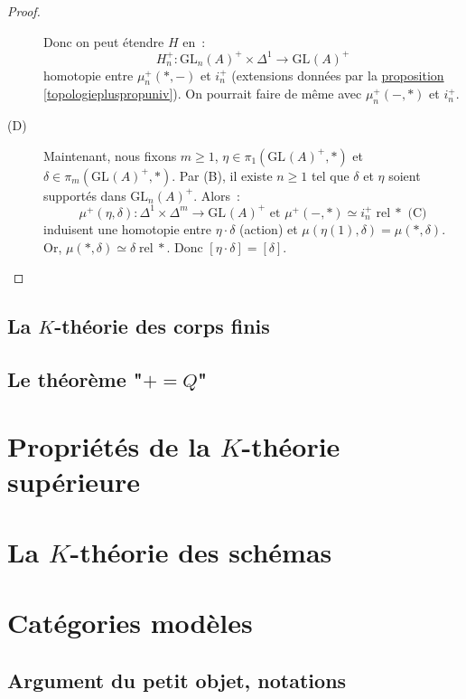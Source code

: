 \documentclass{amsart}
\newcommand{\sref}[2]{\hyperref[#2]{#1 \ref*{#2}}}
\theoremstyle{plain}
\theoremstyle{definition}
\theoremstyle{remark}
\newcommand{\GL}[2]{\mathrm{GL}_{#1}(#2)}
\newcommand{\ra}{\rightarrow}
\begin{document}
\begin{proof}
\begin{description}
    Donc on peut étendre $H$ en~:
    $$H_n^+:\GL{n}{A}^+\times\Delta^1\ra \GL{}{A}^+$$
    homotopie entre $\mu_n^+(*,-)$ et $i_n^+$ (extensions données par la \sref{proposition}{topologiepluspropuniv}). On pourrait faire de même
    avec $\mu_n^+(-,*)$ et $i_n^+$.
    \item[(D)] Maintenant, nous fixons $m\geq 1$, $\eta\in \pi_1(\GL{}{A}^+,*)$ et $\delta\in\pi_m(\GL{}{A}^+,*)$. Par (B), il existe
    $n\geq 1$ tel que $\delta$ et $\eta$ soient supportés dans $\GL{n}{A}^+$. Alors~:
    $$\mu^+(\eta,\delta):\Delta^1\times\Delta^m\ra \GL{}{A}^+\text{ et }\mu^+(-,*)\simeq i_n^+\;\mathrm{rel}\: *\text{ (C)}$$
    induisent une homotopie entre $\eta\cdot\delta$ (action) et $\mu(\eta(1),\delta)=\mu(*,\delta)$. Or, $\mu(*,\delta)\simeq \delta\;\mathrm{rel}\: *$.
    Donc $[\eta\cdot\delta]=[\delta]$.
  \end{description}
\end{proof}

\subsection{\texorpdfstring{La $K$-théorie des corps finis}{La K-théorie des corps finis}}

\subsection{\texorpdfstring{Le théorème "$+=Q$"}{Le théorème "+=Q"}}

\section{\texorpdfstring{Propriétés de la $K$-théorie supérieure}{Propriétés de la K-théorie supérieure}}

\section{\texorpdfstring{La $K$-théorie des schémas}{La K-théorie des schémas}}

\appendix

\section{Catégories modèles}

\subsection{Argument du petit objet, notations}
\end{document}
